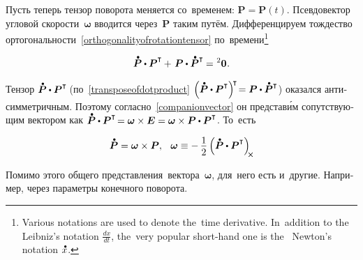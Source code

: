 \begin{otherlanguage}{russian}
Пусть теперь тензор поворота меняется со~временем: ${\bm{P} \!=\! \bm{P}(t)}$.
Псевдовектор угловой скорости~${\bm{\omega}}$ вводится через~$\bm{P}$ таким путём.
Дифференцируем тождество ортогональности~\eqref{orthogonalityofrotationtensor} по~времени\footnote{Various notations are used to denote the~time derivative. In~addition to the Leibniz’s notation ${\frac{dx}{dt}}$, the~very popular short\hbox{-}hand one is the~ Newton’s notation ${\mathdotabove{x}}$.}

\nopagebreak\vspace{-0.1em}\begin{equation*}
\mathdotabove{\bm{P}} \dotp \bm{P}^{\T} \hspace{-0.1ex} + \hspace{.25ex} \bm{P} \dotp \mathdotabove{\bm{P}}^{\T} \hspace{-0.1ex} = \hspace{.1ex} {^2\bm{0}}
\hspace{.1ex} .
\end{equation*}

Тензор ${\mathdotabove{\bm{P}} \dotp \bm{P}^{\T\!}}$ (по~\eqref{transposeofdotproduct} ${\left({ \mathdotabove{\bm{P}} \dotp \bm{P}^{\T} }\right)^{\raisemath{-0.25em}{\!\T}} \hspace{-0.4ex} = \bm{P} \dotp \mathdotabove{\bm{P}}^{\T}}$) оказался анти\-сим\-метрич\-ным.
Поэтому согласно~\eqref{companionvector} он представ\'{и}м сопутствующим вектором как ${\mathdotabove{\bm{P}} \dotp \bm{P}^{\T\!} = \bm{\omega} \times \UnitDyad = \bm{\omega} \times \bm{P} \dotp \bm{P}^{\T}}$\!.
То~есть

\nopagebreak\vspace{-0.1em}\begin{equation}\label{angularvelocityvector}
\mathdotabove{\bm{P}} = \bm{\omega} \times \bm{P}, \;\:\:
\bm{\omega} \equiv -\, \displaystyle \onehalf \left( \mathdotabove{\bm{P}} \dotp \bm{P}^{\T} \right)_{\hspace{-0.2em}\Xcompanion}
\vspace{-0.25em}\end{equation}

Помимо этого общего представления~вектора~${\bm{\omega}}$, для~него есть и~другие. Например, через параметры конечного поворота.


\end{otherlanguage}
